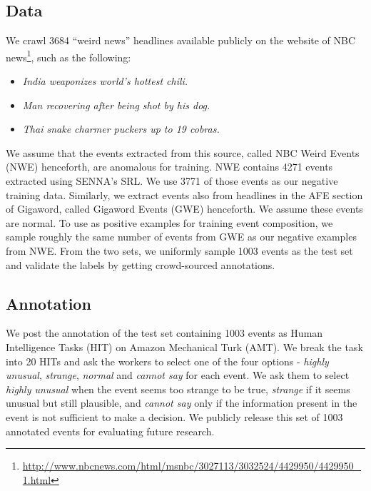 \subsection{Data}
We crawl 3684 ``weird news'' headlines available publicly 
on the website of NBC
news\footnote{\url{
http://www.nbcnews.com/html/msnbc/3027113/3032524/4429950/4429950_1.html}}, 
such as the following: 
\begin{itemize}
 \item \textit{India weaponizes world's hottest chili.}
 \item \textit{Man recovering after being shot by his dog.}
 \item \textit{Thai snake charmer puckers up to 19 cobras.}
\end{itemize}
We assume that the events extracted from this source, called NBC Weird Events
(NWE) henceforth, are
anomalous for training.  NWE contains 4271 events extracted using 
SENNA's SRL.  We use 3771 of those events as our negative training data. 
Similarly, we extract events also from
headlines in the AFE section of Gigaword, called Gigaword Events (GWE)
henceforth.  We assume these events are normal.
To use as positive examples for training event composition, we sample roughly
the same number of events from 
GWE as our negative examples from NWE. From the two sets, we uniformly sample 1003 events
as the test set and validate the labels by getting crowd-sourced annotations.

\subsection{Annotation}
We post the annotation of the test set containing 1003 events as
Human Intelligence Tasks (HIT) on Amazon Mechanical Turk (AMT).
We break the task into 20 HITs and ask the workers to select one of the 
four options - \textit{highly unusual}, \textit{strange}, \textit{normal} and 
\textit{cannot say} for each event.  We ask them to select \textit{highly
unusual} when the 
event seems too strange to be true, \textit{strange} if it seems unusual but 
still plausible, and \textit{cannot say} only if the information present in the 
event is not sufficient to make a decision.  We publicly release this set of 1003
annotated events for evaluating future research.

